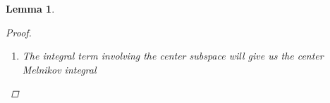 \documentclass[12pt]{article}
\newtheorem{lemma}{Lemma}
\begin{document}
\begin{lemma}
\begin{proof}
\begin{enumerate}
\begin{align*}
\langle \Psi(0), &P^-(0) P_0^c(0) e^{\nu(\lambda) X_{i-1}} c_{i-1}^- - P^+(0) P_0^c(0) e^{-\nu(\lambda)X_i} c_i^+) = e^{\nu(\lambda) X_{i-1}} c_{i-1}^- - e^{-\nu(\lambda)X_i} c_i^+ 
\end{align*}

For the higher order terms involving $c$, from the previous section we have
\begin{align*}
|(P_i^-(0; \lambda) - P^-(0)) P_0^c(0) e^{\nu(\lambda) X_{i-1}} c_{i-1}^- + P_i^-(0; \lambda) (P_0^c(\lambda) - P_0^c(0)) e^{\nu(\lambda) X_{i-1}} c_{i-1}^-| \leq C (|\lambda| + e^{-\alpha X_m}) |\tilde{c}_{i-1}^+|
\end{align*}

and

\begin{align*}
|(P_i^+(0; \lambda) - P^+(0))P_0^c(0) e^{-\nu(\lambda)X_i} c_i^+ + P_i^+(0; \lambda) (P_0^c(\lambda) - P_0^c(0)) e^{-\nu(\lambda)X_i} c_i^+| \leq C (|\lambda| + e^{-\alpha X_m}) |e^{-\nu(\lambda)X_i} c_i^+|
\end{align*}

All that remains is to write $e^{-\nu(\lambda)X_i} c_i^+$ in terms of $e^{-\nu(\lambda)X_i} c_i^-$ using Lemma \ref{inv2}. Doing that, the terms involving the $c_i$ are given by

\begin{align*}
e^{\nu(\lambda) X_{i-1} } &c_{i-1}^- - e^{-\nu(\lambda)X_i} c_i^- + \mathcal{O}\Big( (|\lambda| + e^{-\alpha X_m})(|\tilde{c}_{i-1}^+| + |\tilde{c}_i^-|) + e^{-\tilde{\alpha}X_m} (|\lambda| + e^{-\tilde{\alpha}X_m})|\tilde{c}_{i+1}^-| \\
&+ e^{-\tilde{\alpha}X_i}|c_i^-|
+ e^{-\tilde{\alpha}X_m}( e^{-\alpha X_{i-1}}|c_{i-1}^-| + e^{-\alpha X_{i+1}}|c_{i+1}^-| ) + e^{-\tilde{\alpha}X_m}(|\lambda| + |D_i|)|d| \Big)  
\end{align*}

\item The integral term involving the center subspace will give us the center Melnikov integral


\end{enumerate}
\end{proof}
\end{lemma}
\end{document}
